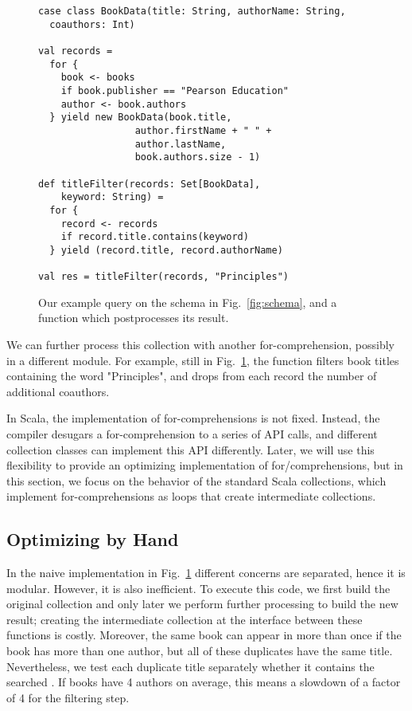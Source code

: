 \begin{figure}[htb]
\begin{lstlisting}
case class BookData(title: String, authorName: String,
  coauthors: Int)

val records =
  for {
    book <- books
    if book.publisher == "Pearson Education"
    author <- book.authors
  } yield new BookData(book.title,
                 author.firstName + " " +
                 author.lastName,
                 book.authors.size - 1)

def titleFilter(records: Set[BookData],
    keyword: String) =
  for {
    record <- records
    if record.title.contains(keyword)
  } yield (record.title, record.authorName)

val res = titleFilter(records, "Principles")
\end{lstlisting}
\caption{Our example query on the schema in Fig.~\ref{fig:schema}, and a function which postprocesses its result.}
\label{fig:query}
\end{figure}

We can further process this collection with another for-comprehension, possibly
in a different module. For example, still in Fig.~\ref{fig:query}, the function
 filters book titles containing the word "Principles", and
drops from each record the number of additional coauthors.

In Scala, the implementation of for-comprehensions is not fixed. Instead, the
compiler desugars a for-comprehension to a series of API calls, and different
collection classes can implement this API differently. Later, we will use this
flexibility to provide an optimizing implementation of for\-/comprehensions, but
in this section, we focus on the behavior of the standard Scala collections,
which implement for-comprehensions as loops that create intermediate
collections.

\subsection{Optimizing by Hand}

In the naive implementation in Fig.~\ref{fig:query} different concerns are separated, hence it is modular. However, it is also inefficient.
To execute this code, we first build the original collection and
only later we perform further processing to build the new result; creating the
intermediate collection at the interface between these functions is costly.
Moreover, the same book can appear in  more than once if the book has more than one author, but all of these duplicates have the same title. Nevertheless, we test each duplicate title separately whether it contains the searched . If books have 4 authors on average, this means a slowdown of a factor of 4 for the filtering step.

